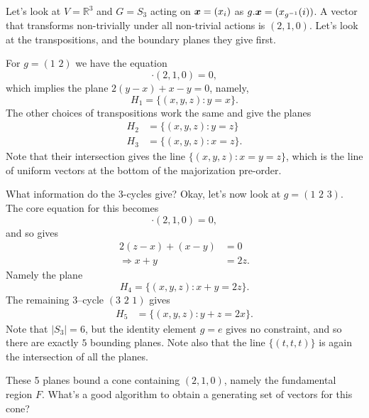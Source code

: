 \documentclass[pra,
aps,
twocolumn,
superscriptaddress,
groupedaddress,
nofootinbib,
reprint
]{revtex4-1}
\begin{document}
Let's look at $V = \mathbb{R}^3$ and $G=S_3$ acting on $\boldsymbol{x} = (x_i)$ as $g.\boldsymbol{x} = (x_{g^{-1}}(i))$. A vector that transforms non-trivially under all non-trivial actions is $(2,1,0)$. Let's look at the transpositions, and the boundary planes they give first.

For $g= (1\,\,2)$ we have the equation
\begin{equation}
[(y,x,z) - (x,y,z)] \cdot (2,1,0) = 0,
\end{equation}
which implies the plane $2(y-x)+ x-y = 0$, namely,
\begin{equation}
H_1 = \{(x,y,z) : y=x\}.
\end{equation}
The other choices of transpositions work the same and give the planes
\begin{align}
H_2 &= \{(x,y,z) : y=z\} \\
H_3 &= \{(x,y,z) : x=z\}.
\end{align}
Note that their intersection gives the line $\{(x,y,z) : x=y=z\}$, which is the line of uniform vectors at the bottom of the majorization pre-order.

What information do the $3$-cycles give? Okay, let's now look at $g=( 1 \,\, 2 \,\, 3)$. The core equation for this becomes
\begin{equation}
[(z,x,y) - (x,y,z)] \cdot (2,1,0) = 0,
\end{equation}
and so gives
\begin{align}
2(z-x) + (x-y) &= 0 \nonumber \\
\Rightarrow x+y &=2z. 
\end{align}
Namely the plane
\begin{equation}
H_4 = \{(x,y,z) :  x+y =2z\}.
\end{equation}The remaining $3$--cycle $(3\,\,2\,\,1)$ gives
\begin{align}
H_5 &= \{(x,y,z) : y+z = 2x\}.
\end{align}
Note that $|S_3| = 6$, but the identity element $g=e$ gives no constraint, and so there are exactly $5$ bounding planes. Note also that the line $\{ (t,t,t)\} $ is again the intersection of all the planes.

These 5 planes bound a cone containing $(2,1,0)$, namely the fundamental region $F$. What's a good algorithm to obtain a generating set of vectors for this cone?
\end{document}
